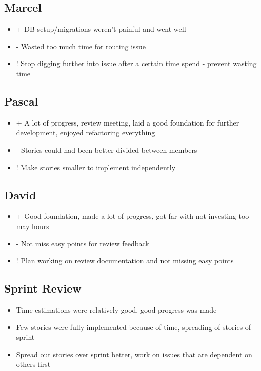 \subsection{Marcel}
\begin{itemize}
    \item + DB setup/migrations weren't painful and went well
    \item - Wasted too much time for routing issue
    \item ! Stop digging further into issue after a certain time spend - prevent wasting time
\end{itemize}

\subsection{Pascal}
\begin{itemize}
    \item + A lot of progress, review meeting, laid a good foundation for further development, enjoyed refactoring everything
    \item - Stories could had been better divided between members
    \item ! Make stories smaller to implement independently
\end{itemize}

\subsection{David}
\begin{itemize}
    \item + Good foundation, made a lot of progress, got far with not investing too may hours
    \item - Not miss easy points for review feedback
    \item ! Plan working on review documentation and not missing easy points
\end{itemize}

\subsection{Sprint Review}
\begin{itemize}
    \item Time estimations were relatively good, good progress was made
    \item Few stories were fully implemented because of time, spreading of stories of sprint
    \item Spread out stories over sprint better, work on issues that are dependent on others first
\end{itemize}


